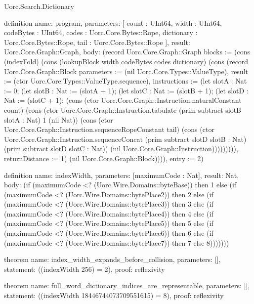 \begin{lexlean}{Uorc.Search.Dictionary}
\begin{semanticmodule}
definition{
  name: program,
  parameters: [
    count : UInt64,
    width : UInt64,
    codeBytes : UInt64,
    codes : Uorc.Core.Bytes::Rope,
    dictionary : Uorc.Core.Bytes::Rope,
    tail : Uorc.Core.Bytes::Rope
  ],
  result: Uorc.Core.Graph::Graph,
  body: (record Uorc.Core.Graph::Graph {blocks := (cons (indexFold) (cons (lookupBlock width codeBytes codes dictionary) (cons (record Uorc.Core.Graph::Block {parameters := (nil Uorc.Core.Types::ValueType), result := (ctor Uorc.Core.Types::ValueType.sequence), instructions := (let slotA : Nat := 0; (let slotB : Nat := (slotA + 1); (let slotC : Nat := (slotB + 1); (let slotD : Nat := (slotC + 1); (cons (ctor Uorc.Core.Graph::Instruction.naturalConstant count) (cons (ctor Uorc.Core.Graph::Instruction.tabulate (prim subtract slotB slotA : Nat) 1 (nil Nat)) (cons (ctor Uorc.Core.Graph::Instruction.sequenceRopeConstant tail) (cons (ctor Uorc.Core.Graph::Instruction.sequenceConcat (prim subtract slotD slotB : Nat) (prim subtract slotD slotC : Nat)) (nil Uorc.Core.Graph::Instruction))))))))), returnDistance := 1}) (nil Uorc.Core.Graph::Block)))), entry := 2})
}

definition{
  name: indexWidth,
  parameters: [maximumCode : Nat],
  result: Nat,
  body: (if (maximumCode <? (Uorc.Wire.Domains::byteBase)) then 1 else (if (maximumCode <? (Uorc.Wire.Domains::bytePlace2)) then 2 else (if (maximumCode <? (Uorc.Wire.Domains::bytePlace3)) then 3 else (if (maximumCode <? (Uorc.Wire.Domains::bytePlace4)) then 4 else (if (maximumCode <? (Uorc.Wire.Domains::bytePlace5)) then 5 else (if (maximumCode <? (Uorc.Wire.Domains::bytePlace6)) then 6 else (if (maximumCode <? (Uorc.Wire.Domains::bytePlace7)) then 7 else 8)))))))
}

theorem{
  name: index_width_expands_before_collision,
  parameters: [],
  statement: ((indexWidth 256) = 2),
  proof: reflexivity{}
}

theorem{
  name: full_word_dictionary_indices_are_representable,
  parameters: [],
  statement: ((indexWidth 18446744073709551615) = 8),
  proof: reflexivity{}
}
\end{semanticmodule}
\end{lexlean}
